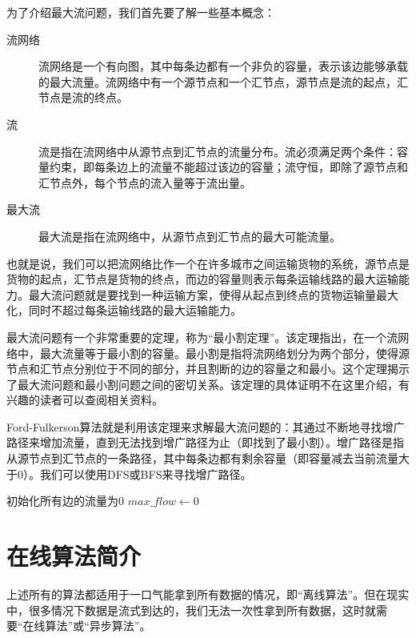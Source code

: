 为了介绍最大流问题，我们首先要了解一些基本概念：
\begin{description}
    \item[流网络] 流网络是一个有向图，其中每条边都有一个非负的容量，表示该边能够承载的最大流量。流网络中有一个源节点和一个汇节点，源节点是流的起点，汇节点是流的终点。
    \item[流] 流是指在流网络中从源节点到汇节点的流量分布。流必须满足两个条件：容量约束，即每条边上的流量不能超过该边的容量；流守恒，即除了源节点和汇节点外，每个节点的流入量等于流出量。
    \item[最大流] 最大流是指在流网络中，从源节点到汇节点的最大可能流量。
\end{description}
也就是说，我们可以把流网络比作一个在许多城市之间运输货物的系统，源节点是货物的起点，汇节点是货物的终点，而边的容量则表示每条运输线路的最大运输能力。最大流问题就是要找到一种运输方案，使得从起点到终点的货物运输量最大化，同时不超过每条运输线路的最大运输能力。

最大流问题有一个非常重要的定理，称为“最小割定理”。该定理指出，在一个流网络中，最大流量等于最小割的容量。最小割是指将流网络划分为两个部分，使得源节点和汇节点分别位于不同的部分，并且割断的边的容量之和最小。这个定理揭示了最大流问题和最小割问题之间的密切关系。该定理的具体证明不在这里介绍，有兴趣的读者可以查阅相关资料。

Ford-Fulkerson算法就是利用该定理来求解最大流问题的：其通过不断地寻找增广路径来增加流量，直到无法找到增广路径为止（即找到了最小割）。增广路径是指从源节点到汇节点的一条路径，其中每条边都有剩余容量（即容量减去当前流量大于0）。我们可以使用DFS或BFS来寻找增广路径。
\begin{algorithm}[htbp]
    \caption{Ford-Fulkerson算法}
    初始化所有边的流量为0\;
    $max\_flow \leftarrow 0$\;
    \;
\end{algorithm}

\section{在线算法简介}

上述所有的算法都适用于一口气能拿到所有数据的情况，即“离线算法”。但在现实中，很多情况下数据是流式到达的，我们无法一次性拿到所有数据，这时就需要“在线算法”或“异步算法”。

